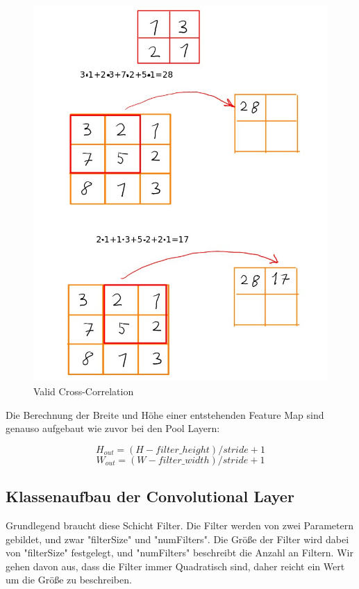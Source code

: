 \documentclass[12pt]{article}
\begin{document}
\begin{figure}[H]
\centering
\includegraphics[scale=0.5]{./Images/Valid_Correlation_005.jpg}
\caption{Valid Cross-Correlation}
\label{Valid Cross-Correlation}
\end{figure}

Die Berechnung der Breite und Höhe einer entstehenden Feature Map sind genauso aufgebaut wie zuvor bei den Pool Layern:

$$H_{out} = (H - filter\_height)/stride + 1$$
$$W_{out} = (W - filter\_ width)/stride + 1$$












\cleardoublepage
\subsection{Klassenaufbau der Convolutional Layer}
Grundlegend braucht diese Schicht Filter. Die Filter werden von zwei Parametern gebildet, und zwar "filterSize" und "numFilters". Die Größe der Filter wird dabei von "filterSize" festgelegt, und "numFilters" beschreibt die Anzahl an Filtern. Wir gehen davon aus, dass die Filter immer Quadratisch sind, daher reicht ein Wert um die Größe zu beschreiben.
\end{document}

